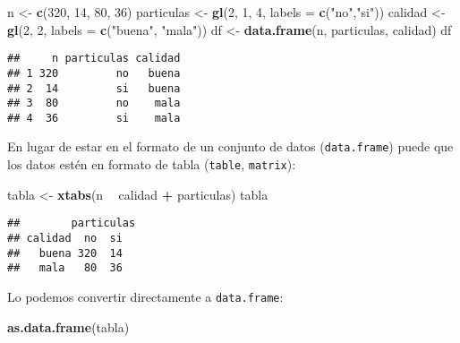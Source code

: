 \documentclass[
]{book}
\newenvironment{Shaded}{\begin{snugshade}}{\end{snugshade}}
\newcommand{\DataTypeTok}[1]{\textcolor[rgb]{0.13,0.29,0.53}{#1}}
\newcommand{\DecValTok}[1]{\textcolor[rgb]{0.00,0.00,0.81}{#1}}
\newcommand{\KeywordTok}[1]{\textcolor[rgb]{0.13,0.29,0.53}{\textbf{#1}}}
\newcommand{\NormalTok}[1]{#1}
\newcommand{\OperatorTok}[1]{\textcolor[rgb]{0.81,0.36,0.00}{\textbf{#1}}}
\newcommand{\StringTok}[1]{\textcolor[rgb]{0.31,0.60,0.02}{#1}}
\theoremstyle{break}
\theoremstyle{definition}
\theoremstyle{definition}
\theoremstyle{definition}
\theoremstyle{remark}
\begin{document}
\begin{Shaded}
\begin{Highlighting}[]
\NormalTok{n <-}\StringTok{ }\KeywordTok{c}\NormalTok{(}\DecValTok{320}\NormalTok{, }\DecValTok{14}\NormalTok{, }\DecValTok{80}\NormalTok{, }\DecValTok{36}\NormalTok{)}
\NormalTok{particulas <-}\StringTok{ }\KeywordTok{gl}\NormalTok{(}\DecValTok{2}\NormalTok{, }\DecValTok{1}\NormalTok{, }\DecValTok{4}\NormalTok{, }\DataTypeTok{labels =} \KeywordTok{c}\NormalTok{(}\StringTok{"no"}\NormalTok{,}\StringTok{"si"}\NormalTok{))}
\NormalTok{calidad <-}\StringTok{ }\KeywordTok{gl}\NormalTok{(}\DecValTok{2}\NormalTok{, }\DecValTok{2}\NormalTok{, }\DataTypeTok{labels =} \KeywordTok{c}\NormalTok{(}\StringTok{"buena"}\NormalTok{, }\StringTok{"mala"}\NormalTok{))}
\NormalTok{df <-}\StringTok{ }\KeywordTok{data.frame}\NormalTok{(n, particulas, calidad)}
\NormalTok{df}
\end{Highlighting}
\end{Shaded}

\begin{verbatim}
##     n particulas calidad
## 1 320         no   buena
## 2  14         si   buena
## 3  80         no    mala
## 4  36         si    mala
\end{verbatim}

En lugar de estar en el formato de un conjunto de datos (\texttt{data.frame})
puede que los datos estén en formato de tabla (\texttt{table}, \texttt{matrix}):

\begin{Shaded}
\begin{Highlighting}[]
\NormalTok{tabla <-}\StringTok{ }\KeywordTok{xtabs}\NormalTok{(n }\OperatorTok{~}\StringTok{ }\NormalTok{calidad }\OperatorTok{+}\StringTok{ }\NormalTok{particulas)}
\NormalTok{tabla}
\end{Highlighting}
\end{Shaded}

\begin{verbatim}
##        particulas
## calidad  no  si
##   buena 320  14
##   mala   80  36
\end{verbatim}

Lo podemos convertir directamente a \texttt{data.frame}:

\begin{Shaded}
\begin{Highlighting}[]
\KeywordTok{as.data.frame}\NormalTok{(tabla)}
\end{Highlighting}
\end{Shaded}
\end{document}
